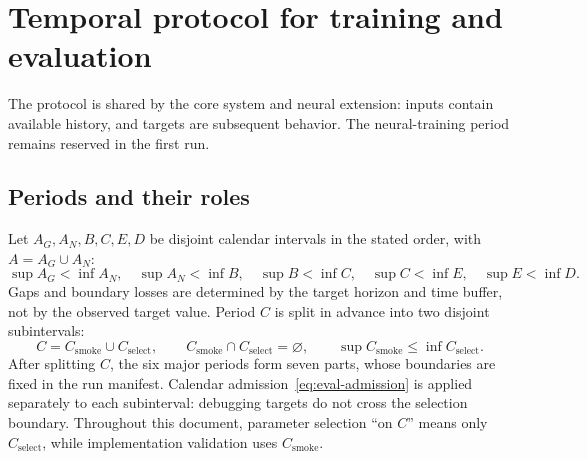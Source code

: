 \documentclass[12pt,a4paper]{article}
\theoremstyle{plainru}
\begin{document}
\section{Temporal protocol for training and evaluation}\label{sec:eval-temporal}

The protocol is shared by the core system and neural extension:
inputs contain available history, and targets are subsequent behavior.
The neural-training period remains reserved in the first run.

\subsection{Periods and their roles}\label{sec:eval-periods}

Let $A_G,A_N,B,C,E,D$ be disjoint calendar intervals
in the stated order, with $A=A_G\cup A_N$:
\begin{equation}\label{eq:eval-period-order}
\sup A_G<\inf A_N,\quad \sup A_N<\inf B,\quad
\sup B<\inf C,\quad \sup C<\inf E,\quad \sup E<\inf D.
\end{equation}
Gaps and boundary losses are determined by the target horizon and time buffer,
not by the observed target value.
Period $C$ is split in advance into two disjoint subintervals:
\begin{equation}\label{eq:eval-validation-split}
C=C_{\mathrm{smoke}}\cup C_{\mathrm{select}},\qquad
C_{\mathrm{smoke}}\cap C_{\mathrm{select}}=\varnothing,\qquad
\sup C_{\mathrm{smoke}}\le\inf C_{\mathrm{select}}.
\end{equation}
After splitting $C$, the six major periods form seven parts,
whose boundaries are fixed in the run manifest.
Calendar admission~\eqref{eq:eval-admission} is applied separately to each
subinterval: debugging targets do not cross the selection boundary.
Throughout this document, parameter selection ``on $C$'' means only
$C_{\mathrm{select}}$, while implementation validation uses $C_{\mathrm{smoke}}$.
\end{document}
